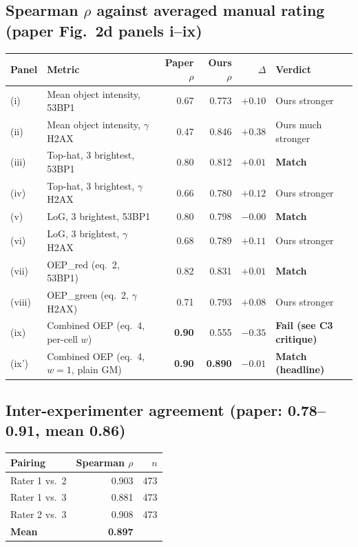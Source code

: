 \documentclass[11pt]{article}
\begin{document}
\subsection{Spearman $\rho$ against averaged manual rating (paper Fig.~2d panels i--ix)}
\begin{longtable}{@{}p{}p{}rrrp{}@{}}
\toprule
Panel & Metric & Paper $\rho$ & Ours $\rho$ & $\Delta$ & Verdict \\
\midrule
(i)   & Mean object intensity, 53BP1        & 0.67 & 0.773 & $+0.10$ & Ours stronger \\
(ii)  & Mean object intensity, $\gamma$H2AX & 0.47 & 0.846 & $+0.38$ & Ours much stronger \\
(iii) & Top-hat, 3 brightest, 53BP1         & 0.80 & 0.812 & $+0.01$ & \textbf{Match} \\
(iv)  & Top-hat, 3 brightest, $\gamma$H2AX  & 0.66 & 0.780 & $+0.12$ & Ours stronger \\
(v)   & LoG, 3 brightest, 53BP1             & 0.80 & 0.798 & $-0.00$ & \textbf{Match} \\
(vi)  & LoG, 3 brightest, $\gamma$H2AX      & 0.68 & 0.789 & $+0.11$ & Ours stronger \\
(vii) & OEP\_red (eq.~2, 53BP1)             & 0.82 & 0.831 & $+0.01$ & \textbf{Match} \\
(viii)& OEP\_green (eq.~2, $\gamma$H2AX)    & 0.71 & 0.793 & $+0.08$ & Ours stronger \\
(ix)  & Combined OEP (eq.~4, per-cell $w$)  & \textbf{0.90} & 0.555 & $-0.35$ & \textbf{Fail (see C3 critique)} \\
(ix') & Combined OEP (eq.~4, $w=1$, plain GM) & \textbf{0.90} & \textbf{0.890} & $-0.01$ & \textbf{Match (headline)} \\
\bottomrule
\end{longtable}

\subsection{Inter-experimenter agreement (paper: 0.78--0.91, mean 0.86)}
\begin{center}
\begin{tabular}{@{}lrr@{}}
\toprule
Pairing & Spearman $\rho$ & $n$ \\
\midrule
Rater 1 vs.\ 2 & 0.903 & 473 \\
Rater 1 vs.\ 3 & 0.881 & 473 \\
Rater 2 vs.\ 3 & 0.908 & 473 \\
\midrule
\textbf{Mean}  & \textbf{0.897} & \\
\bottomrule
\end{tabular}
\end{center}
\end{document}
